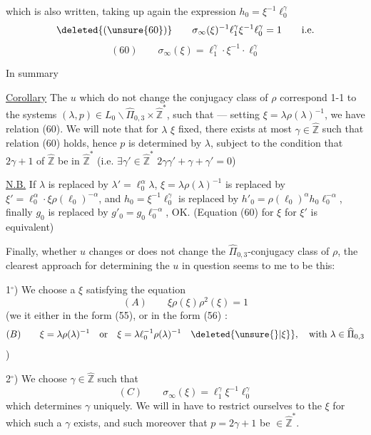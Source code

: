 which is also written, taking up again the expression $h_0=\xi^{-1}\ell_0^\gamma$
\[
\deleted{(\unsure{60})}\qquad
\sigma_\infty(\xi)^{-1}\ell_1^\gamma\xi^{-1}\ell_0^\gamma=1
\qquad\text{i.e.}
\]
\[
(60)\qquad \sigma_\infty(\xi)=\ell_1^\gamma\cdot\xi^{-1}\cdot\ell_0^\gamma
\]

In summary

\uline{Corollary} The $u$ which do not change the conjugacy class of $\rho$  correspond 1-1 to the systems $(\lambda,p)\in L_0\backslash\widehat{\Pi}_{0,3}\times\widehat{\mathbb Z}^{*}$, such that --- setting $\xi=\lambda\rho(\lambda)^{-1}$,  we have relation (60).
We will note that for $\lambda$  $\xi$ fixed, there exists at most  $\gamma\in\widehat{\mathbb Z}$ such that relation (60) holds, hence $p$ is determined by $\lambda$, subject to the  condition that  $2\gamma+1$ of $\widehat{\mathbb Z}$ be in $\widehat{\mathbb Z}^{*}$ (i.e. $\exists\gamma'\in\widehat{\mathbb Z}^{*}$  $2\gamma\gamma'+\gamma+\gamma'=0$)


\uline{N.B.} If $\lambda$ is replaced by $\lambda'=\ell_0^\alpha\lambda$, $\xi=\lambda\rho(\lambda)^{-1}$ is replaced by $\xi'=\ell_0^\alpha\cdot\xi\rho(\ell_0)^{-\alpha}$, and $h_0=\xi^{-1}\ell_0^\gamma$ is replaced by $h'_0=\rho(\ell_0)^\alpha h_0\ell_0^{-\alpha}$, finally $g_0$ is replaced by $g'_0=g_0\ell_0^{-\alpha}$, OK. \unsure{!} (Equation (60) for $\xi$  for $\xi'$ is equivalent)

Finally, whether $u$ changes or does not change the $\widehat{\Pi}_{0,3}$-conjugacy class of $\rho$, the clearest approach for determining the $u$ in question seems to me to be this:

1$^\circ$) We choose a $\xi$  satisfying the equation
\[
(A)\qquad \xi\rho(\xi)\rho^2(\xi)=1
\]
(we  it either in the form (55), or in the form (56)\deleted{\unsure{)}} :
\[
(B)\qquad
\xi=\lambda\rho(\lambda)^{-1}
\quad\text{or}\quad
\xi=\lambda\ell_0^{-1}\rho(\lambda)^{-1}
\quad\deleted{\unsure{\rbrace|\xi}},\quad\text{with }\lambda\in\widehat{\Pi}_{0,3}
\]
)

2$^\circ$) We choose $\gamma\in\widehat{\mathbb Z}$ such that
\[
(C)\qquad \sigma_\infty(\xi)=\ell_1^\gamma\xi^{-1}\ell_0^\gamma
\]
which determines $\gamma$ uniquely. We will in  have to restrict ourselves to the $\xi$  for which such a $\gamma$ exists, and such moreover that $p=2\gamma+1$ be $\in\widehat{\mathbb Z}^{*}$.
